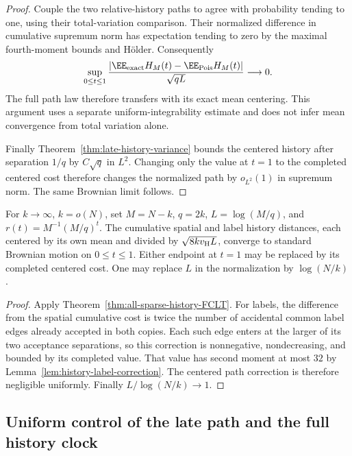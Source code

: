 \documentclass[11pt,letterpaper]{article}
\begin{document}
\begin{proof}
Couple the two relative-history paths to agree with probability
tending to one, using their total-variation comparison.
Their normalized difference in cumulative supremum norm has
expectation tending to zero by the maximal fourth-moment
bounds and H\"older. Consequently
\[
 \sup_{0\le t\le1}
 \frac{|\EE_{\rm exact}H_M(t)-\EE_{\rm Pois}H_M(t)|}
                         {\sqrt{qL}}\longrightarrow0.
\]
The full path law therefore transfers with its exact mean
centering. This argument uses a separate uniform-integrability
estimate and does not infer mean convergence from total
variation alone.

Finally Theorem~\ref{thm:late-history-variance} bounds the
centered history after separation $1/q$ by $C\sqrt q$ in
$L^2$. Changing only the value at $t=1$ to the completed
centered cost therefore changes the normalized path by
$o_{L^2}(1)$ in supremum norm. The same Brownian limit follows.
\end{proof}

\begin{corollary}
\label{cor:resampling-history-FCLT}
For $k\to\infty$, $k=o(N)$, set $M=N-k$, $q=2k$,
$L=\log(M/q)$, and $r(t)=M^{-1}(M/q)^t$.
The cumulative spatial and label history distances, each
centered by its own mean and divided by
$\sqrt{8kv_{\rm H}L}$, converge to standard Brownian motion
on $0\le t\le1$. Either endpoint at $t=1$ may be replaced
by its completed centered cost.
One may replace $L$ in the normalization by $\log(N/k)$.
\end{corollary}
\begin{proof}
Apply Theorem~\ref{thm:all-sparse-history-FCLT}.
For labels, the difference from the spatial cumulative cost
is twice the number of accidental common label edges already
accepted in both copies. Each such edge enters at the larger
of its two acceptance separations, so this correction is
nonnegative, nondecreasing, and bounded by its completed value.
That value has second moment at most $32$ by
Lemma~\ref{lem:history-label-correction}.
The centered path correction is therefore negligible uniformly.
Finally $L/\log(N/k)\to1$.
\end{proof}

\subsection{Uniform control of the late path and the full history clock}
\label{sec:late-history-maximal}
\end{document}
